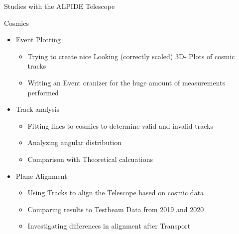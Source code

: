 \documentclass{beamer}
\begin{document}
\begin{frame}{Studies with the ALPIDE Telescope}
    \begin{minipage}{.44\textwidth}
	\LARGE Cosmics \normalsize \\
	\begin{itemize}
	    \item Event Plotting
		\begin{itemize}
		    \item \tiny Trying to create nice Looking (correctly scaled) 3D-
			Plots of cosmic tracks
		    \item Writing an Event oranizer for the huge amount of
			measurements performed
		\end{itemize}
	    \item Track analysis
		\begin{itemize}
		    \item \tiny Fitting lines to cosmics to determine valid and
			invalid tracks
		    \item \tiny Analyzing angular distribution
		    \item \tiny Comparison with Theoretical calcuations
		\end{itemize}
	    \item Plane Alignment
		\begin{itemize}
		    \item \tiny Using Tracks to align the Telescope  based on
			cosmic data
		    \item Comparing results to Testbeam Data from 2019 and 2020
		    \item Investigating differences in alignment after Transport
		\end{itemize}
	

\end{itemize}
\end{minipage}
\end{frame}
\end{document}
